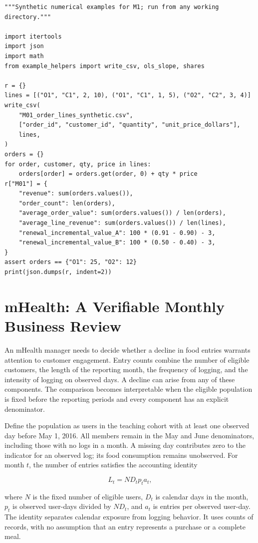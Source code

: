 \begin{Verbatim}[breaklines,breakanywhere,fontsize=\small]
"""Synthetic numerical examples for M1; run from any working directory."""

import itertools
import json
import math
from example_helpers import write_csv, ols_slope, shares

r = {}
lines = [("O1", "C1", 2, 10), ("O1", "C1", 1, 5), ("O2", "C2", 3, 4)]
write_csv(
    "M01_order_lines_synthetic.csv",
    ["order_id", "customer_id", "quantity", "unit_price_dollars"],
    lines,
)
orders = {}
for order, customer, qty, price in lines:
    orders[order] = orders.get(order, 0) + qty * price
r["M01"] = {
    "revenue": sum(orders.values()),
    "order_count": len(orders),
    "average_order_value": sum(orders.values()) / len(orders),
    "average_line_revenue": sum(orders.values()) / len(lines),
    "renewal_incremental_value_A": 100 * (0.91 - 0.90) - 3,
    "renewal_incremental_value_B": 100 * (0.50 - 0.40) - 3,
}
assert orders == {"O1": 25, "O2": 12}
print(json.dumps(r, indent=2))
\end{Verbatim}

\hypertarget{M01-mhealth-a-verifiable-monthly-business-review}{%
\section{mHealth: A Verifiable Monthly Business
Review}\label{M01-mhealth-a-verifiable-monthly-business-review}}

\noindent \noindent An mHealth manager needs to decide whether a decline in food
entries warrants attention to customer engagement. Entry counts combine
the number of eligible customers, the length of the reporting month, the
frequency of logging, and the intensity of logging on observed days. A
decline can arise from any of these components. The comparison becomes
interpretable when the eligible population is fixed before the reporting
periods and every component has an explicit denominator.

Define the population as users in the teaching cohort with at least one
observed day before May 1, 2016. All members remain in the May and June
denominators, including those with no logs in a month. A missing day
contributes zero to the indicator for an observed log; its food
consumption remains unobserved. For month \(t\), the number of entries
satisfies the accounting identity

\[
L_t=N D_t p_t a_t,
\]

where \(N\) is the fixed number of eligible users, \(D_t\) is calendar
days in the month, \(p_t\) is observed user-days divided by \(ND_t\),
and \(a_t\) is entries per observed user-day. The identity separates
calendar exposure from logging behavior. It uses counts of records, with
no assumption that an entry represents a purchase or a complete meal.

